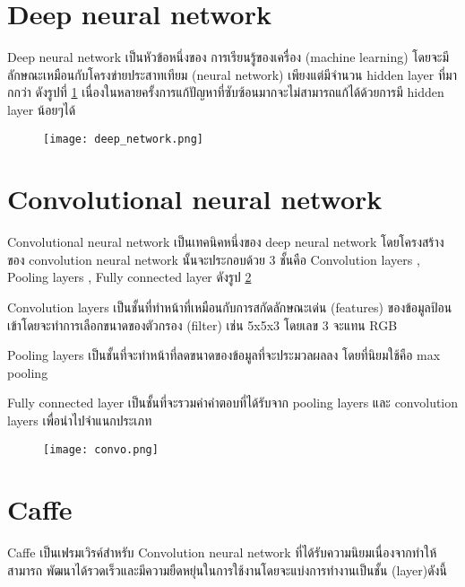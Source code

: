  \section{Deep neural network} Deep neural network เป็นหัวข้อหนึ่งของ การเรียนรู้ของเครื่อง (machine learning) โดยจะมีลักษณะเหมือนกับโครงข่ายประสาทเทียม (neural network) เพียงแต่มีจำนวน hidden layer ที่มากกว่า ดังรูปที่ \ref{fig:deep-network} เนื่องในหลายครั้งการแก้ปัญหาที่ซับซ้อนมากจะไม่สามารถแก้ได้ด้วยการมี hidden layer น้อยๆได้
  \begin{center}
  \begin{figure}[t]
    \captionsetup{justification=centering}
    \centering
    \texttt{[image: deep\_network.png]}
  \label{fig:deep-network}
 \hrulefill
\end{figure}
 \end{center}
\section{Convolutional neural network \cite{Deep}}
Convolutional neural network เป็นเทคนิคหนึ่งของ deep neural network โดยโครงสร้างของ convolution neural network นั้นจะประกอบด้วย 3 ชั้นคือ Convolution layers , Pooling layers , Fully connected layer ดังรูป \ref{fig:convo-network}

Convolution layers เป็นชั้นที่ทำหน้าที่เหมือนกับการสกัดลักษณะเด่น (features) ของข้อมูลป้อนเข้าโดยจะทำการเลือกขนาดของตัวกรอง (filter) เช่น 5x5x3 โดยเลข 3 จะแทน RGB

Pooling layers เป็นชั้นที่จะทำหน้าที่ลดขนาดของข้อมูลที่จะประมวลผลลง
โดยที่นิยมใช้คือ max pooling

Fully connected layer เป็นชั้นที่จะรวมค่าคำตอบที่ได้รับจาก pooling layers และ convolution layers เพื่อนำไปจำแนกประเภท

 \begin{center}
  \begin{figure}[t]
    \captionsetup{justification=centering}
    \centering
    \texttt{[image: convo.png]}
  \label{fig:convo-network}
  \hrulefill
\end{figure}
 \end{center}
\section{Caffe \cite{Caffe}}
Caffe เป็นเฟรมเวิรค์สำหรับ Convolution neural network ที่ได้รับความนิยมเนื่องจากทำให้สามารถ
พัฒนาได้รวดเร็วและมีความยืดหยุ่นในการใช้งานโดยจะแบ่งการทำงานเป็นชั้น (layer)ดังนี้

